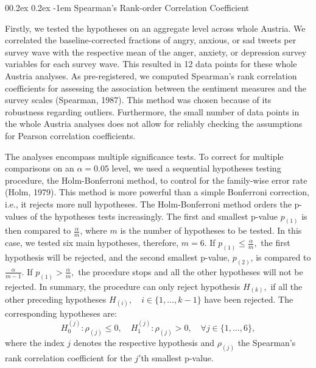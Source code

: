 \documentclass[
  english,
  jou,floatsintext]{apa7}
\makeatletter
\let\oldparagraph\paragraph
\renewcommand{\paragraph}[1]{\oldparagraph{#1}\mbox{}}
\renewcommand{\paragraph}{\@startsection{paragraph}{4}{\parindent}%
  {0\baselineskip \@plus 0.2ex \@minus 0.2ex}%
  {-1em}%
  {\normalfont\normalsize\bfseries\itshape\typesectitle}}
\makeatother
\begin{document}
\hypertarget{spearmans-rank-order-correlation-coefficient}{%
\paragraph{Spearman's Rank-order Correlation Coefficient}\label{spearmans-rank-order-correlation-coefficient}}

Firstly, we tested the hypotheses on an aggregate level across whole Austria. We correlated the baseline-corrected fractions of angry, anxious, or sad tweets per survey wave with the respective mean of the anger, anxiety, or depression survey variables for each survey wave. This resulted in 12 data points for these whole Austria analyses. As pre-registered, we computed Spearman's rank correlation coefficients for assessing the association between the sentiment measures and the survey scales (Spearman, 1987). This method was chosen because of its robustness regarding outliers. Furthermore, the small number of data points in the whole Austria analyses does not allow for reliably checking the assumptions for Pearson correlation coefficients.

\newcommand{\arctanh}{\operatorname{arctanh}}

The analyses encompass multiple significance tests. To correct for multiple comparisons on an \(\alpha = 0.05\) level, we used a sequential hypotheses testing procedure, the Holm-Bonferroni method, to control for the family-wise error rate (Holm, 1979). This method is more powerful than a simple Bonferroni correction, i.e., it rejects more null hypotheses. The Holm-Bonferroni method orders the p-values of the hypotheses tests increasingly. The first and smallest p-value \(p_{(1)}\) is then compared to \(\frac{\alpha}{m}\), where \(m\) is the number of hypotheses to be tested. In this case, we tested six main hypotheses, therefore, \(m = 6.\) If \(p_{(1)} \le \frac{\alpha}{m},\) the first hypothesis will be rejected, and the second smallest p-value, \(p_{(2)}\), is compared to \(\frac{\alpha}{m - 1}\). If \(p_{(1)} > \frac{\alpha}{m},\) the procedure stops and all the other hypotheses will not be rejected. In summary, the procedure can only reject hypothesis \(H_{(k)},\) if all the other preceding hypotheses \(H_{(i)}, \quad i \in \{1, \dots, k -1\}\) have been rejected.
The corresponding hypotheses are:
\begin{equation}
H_0^{(j)}: \rho_{(j)} \le 0, \quad  H_1^{(j)}: \rho_{(j)} > 0, \quad \forall j \in \{1, \dots, 6\}, \label{eq:holm}
\end{equation}
where the index \(j\) denotes the respective hypothesis and \(\rho_{(j)}\) the Spearman's rank correlation coefficient for the \(j'\)th smallest p-value.
\end{document}
